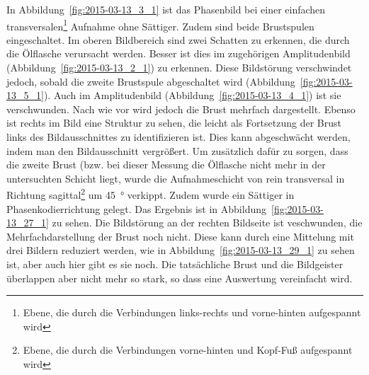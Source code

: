 \documentclass[
    11pt,
    ngerman
]{scrbook}
\begin{document}
In Abbildung~\ref{fig:2015-03-13_3_1} ist das Phasenbild bei einer einfachen
transversalen\footnote{Ebene, die durch die Verbindungen links-rechts und
vorne-hinten aufgespannt wird} Aufnahme ohne Sättiger. Zudem sind beide
Brustspulen eingeschaltet. Im oberen Bildbereich sind zwei Schatten zu
erkennen, die durch die Ölflasche verursacht werden. Besser ist dies im
zugehörigen Amplitudenbild (Abbildung~\ref{fig:2015-03-13_2_1}) zu erkennen.
Diese Bildstörung verschwindet jedoch, sobald die zweite Brustspule
abgeschaltet wird (Abbildung~\ref{fig:2015-03-13_5_1}). Auch im Amplitudenbild
(Abbildung~\ref{fig:2015-03-13_4_1}) ist sie verschwunden. Nach wie vor wird
jedoch die Brust mehrfach dargestellt. Ebenso ist rechts im Bild eine Struktur
zu sehen, die leicht als Fortsetzung der Brust links des Bildausschnittes zu
identifizieren ist. Dies kann abgeschwächt werden, indem man den Bildausschnitt
vergrößert. Um zusätzlich dafür zu sorgen, dass die zweite Brust (bzw. bei
dieser Messung die Ölflasche nicht mehr in der untersuchten Schicht liegt,
wurde die Aufnahmeschicht von rein transversal in Richtung
sagittal\footnote{Ebene, die durch die Verbindungen vorne-hinten und Kopf-Fuß
aufgespannt wird} um \SI{45}{\degree} verkippt. Zudem wurde ein Sättiger in
Phasenkodierrichtung gelegt. Das Ergebnis ist in
Abbildung~\ref{fig:2015-03-13_27_1} zu sehen. Die Bildstörung an der rechten
Bildseite ist veschwunden, die Mehrfachdarstellung der Brust noch nicht. Diese
kann durch eine Mittelung mit drei Bildern reduziert werden, wie in
Abbildung~\ref{fig:2015-03-13_29_1} zu sehen ist, aber auch hier gibt es sie
noch.  Die tatsächliche Brust und die Bildgeister überlappen aber nicht mehr so
stark, so dass eine Auswertung vereinfacht wird.
\end{document}
